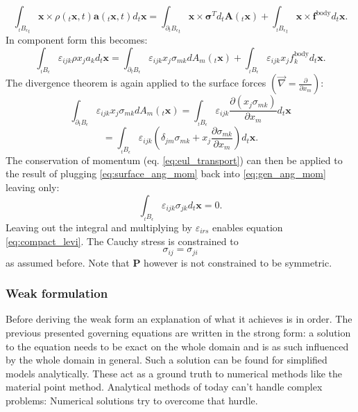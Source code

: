 \documentclass[m,times]{cgMA}
\begin{document}
\begin{equation}
\int _ {_tB _ { \epsilon}  } _t\boldsymbol{x} \times \rho ( _t\boldsymbol{x} , t ) \boldsymbol{a} ( _t\boldsymbol{x} , t ) d _t\boldsymbol{x} = \int _ { \partial _tB _ {\epsilon  } }_t\boldsymbol{x} \times  \boldsymbol{\sigma}^T d_t\boldsymbol{A} (_t\boldsymbol{x} ) + \int _ { _tB_\epsilon }_t\boldsymbol{x} \times  \boldsymbol{f} ^ {\text{body} } d _t\boldsymbol{x}.
\end{equation}
In component form this becomes:
\begin{equation}\label{eq:gen_ang_mom}
  \int _ {_tB _ { \epsilon}  } \varepsilon_{ijk} \rho x_j a_k d _t\boldsymbol{x} = \int _ { \partial _tB _ {\epsilon  } } \varepsilon_{ijk} x_j \sigma_{mk} dA_m(_t\boldsymbol{x} ) + \int _ { _tB_\epsilon } \varepsilon_{ijk} x_j f_k ^ {\text{body} } d _t\boldsymbol{x}.
\end{equation}
The divergence theorem is again applied to the surface forces $\left(\vec{\nabla} = \frac{\partial}{\partial x_m}\right)$:
$$
\int _ { \partial _tB _ {\epsilon  } } \varepsilon_{ijk} x_j \sigma_{mk} dA_m (_t\boldsymbol{x} ) =
\int _ {_tB _ {\epsilon  } } \varepsilon_{ijk} \frac{\partial(x_j \sigma_{mk})}{\partial x_m} d_t\boldsymbol{x}
$$
\begin{equation}\label{eq:surface_ang_mom}
  = \int _ {_tB _ {\epsilon  } } \varepsilon_{ijk} \left(\delta_{jm} \sigma_{mk}+ x_j\frac{ \partial \sigma_{mk}}{\partial x_m}\right) d_t\boldsymbol{x}.
\end{equation}
The conservation of momentum (eq. \ref{eq:eul_transport}) can then be applied to the result of plugging \ref{eq:surface_ang_mom} back into \ref{eq:gen_ang_mom} leaving only:
\begin{equation}
  \int _ {_tB _ {\epsilon  } } \varepsilon_{ijk} \sigma_{jk} d_t\boldsymbol{x} = 0.
\end{equation}
Leaving out the integral and multiplying by ${\varepsilon_{irs}}$ enables equation \ref{eq:compact_levi}. The Cauchy stress is constrained to
\begin{equation}
  \sigma_{ij} =\sigma_{ji}
\end{equation}
as assumed before. Note that $\boldsymbol{P}$ however is not constrained to be symmetric.
\begin{flushright}\cite{MPM:COURSE}\cite{MIT:CONTINUUM_MECHANICS}\end{flushright}
\subsubsection{Weak formulation}\label{sec:weak}
Before deriving the weak form an explanation of what it achieves is in order. The previous presented governing equations are written in the strong form: a solution to the equation needs to be exact on the whole domain and is as such influenced by the whole domain in general. Such a solution can be found for simplified models analytically. These act as a ground truth to numerical methods like the material point method. Analytical methods of today can't handle complex problems: Numerical solutions try to overcome that hurdle.
\end{document}
